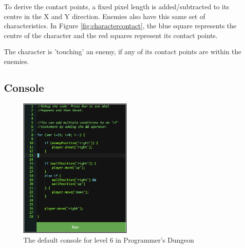 \documentclass[a4paper,11.5pt]{report}
\numberwithin{figure}{section}
\numberwithin{table}{section}
\numberwithin{equation}{section}
\numberwithin{equation}{section}
\begin{document}
To derive the contact points, a fixed pixel length is added/subtracted to its centre in the X and Y direction. Enemies also have this same set of characteristics. In Figure \ref{fig:charactercontact}, the blue square represents the centre of the character and the red squares represent its contact points. 

The character is 'touching' an enemy, if any of its contact points are within the enemies.

\subsection{Console}

\begin{figure}
    \includegraphics[width=0.5\textwidth]{consolelevelsix}
       \captionsetup{justification=centering}
\caption{The default console for level 6 in Programmer's Dungeon}
\label{fig:consolelevelsix}
\end{figure}





\end{document}
